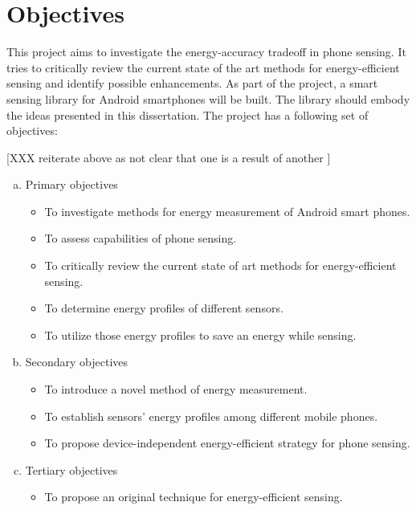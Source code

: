 \section{Objectives}
\label{s:objectives}
This project aims to investigate the energy-accuracy tradeoff in phone sensing. It tries to critically review the current state of the art methods for energy-efficient sensing and identify possible enhancements. As part of the project, a smart sensing library for Android smartphones will be built. The library should embody the ideas presented in this dissertation. The project has a following set of objectives:
 
[XXX reiterate above as not clear that one is a result of another ]\\


\begin{enumerate}[(a)]
 \item Primary objectives
  \begin{itemize}
  	\item To investigate methods for energy measurement of Android smart phones.
  	\item To assess capabilities of phone sensing.
  	\item To critically review the current state of art methods for energy-efficient sensing.
  	\item To determine energy profiles of different sensors.
  	\item To utilize those energy profiles to save an energy while sensing.
  \end{itemize}
  \item Secondary objectives
  \begin{itemize}
    \item To introduce a novel method of energy measurement.
  	\item To establish sensors' energy profiles among different mobile phones.
  	\item To propose device-independent energy-efficient strategy for phone sensing.
  \end{itemize}
  \item Tertiary objectives
  \begin{itemize}
   \item To propose an original technique for energy-efficient sensing.
  \end{itemize}
\end{enumerate}